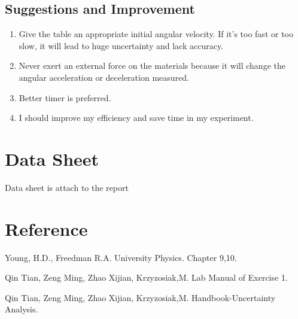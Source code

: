 \documentclass[12pt]{article}
\begin{document}
\subsection{Suggestions and Improvement}
\begin{enumerate}
\item Give the table an appropriate initial angular velocity. If it's too fast or too slow, it will lead to huge uncertainty and lack accuracy.
\item Never exert an external force on the materials because it will change the angular acceleration or deceleration measured. 
\item Better timer is preferred.
\item I should improve my efficiency and save time in my experiment.
\end{enumerate}
\section{Data Sheet}
Data sheet is attach to the report
\section{Reference}
\par Young, H.D., Freedman R.A. University Physics. Chapter 9,10.
\par Qin Tian, Zeng Ming, Zhao Xijian, Krzyzosiak,M. Lab Manual of Exercise 1.
\par Qin Tian, Zeng Ming, Zhao Xijian, Krzyzosiak,M. Handbook-Uncertainty Analysis.
\end{document}
